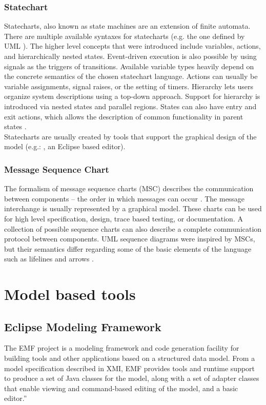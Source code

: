 \subsubsection{Statechart}

Statecharts, also known as state machines are an extension of finite automata. There are multiple available syntaxes for statecharts (e.g. the one defined by UML \citep{stcuml}). The higher level concepts that were introduced include variables, actions, and hierarchically nested states. Event-driven execution is also possible by using signals as the triggers of transitions. Available variable types heavily depend on the concrete semantics of the chosen statechart language. Actions can usually be variable assignments, signal raises, or the setting of timers. Hierarchy lets users organize system descriptions using a top-down approach. Support for hierarchy is introduced via nested states and parallel regions. States can also have entry and exit actions, which allows the description of common functionality in parent states \citep{stcmove}.\\
Statecharts are usually created by tools that support the graphical design of the model (e.g.: \citep{yakinduu}, an Eclipse based editor).

\subsubsection{Message Sequence Chart}

The formalism of message sequence charts (MSC) describes the communication between components -- the order in which messages can occur \citep{msc} \citep{msc2}. The message interchange is usually represented by a graphical model. These charts can be used for high level specification, design, trace based testing, or documentation. A collection of possible sequence charts can also describe a complete communication protocol between components. UML sequence diagrams were inspired by MSCs, but their semantics differ regarding some of the basic elements of the language such as lifelines and arrows \citep{mscuml}.

\section{Model based tools}

\subsection{Eclipse Modeling Framework}
The EMF project is a modeling framework and code generation facility for building tools and other applications based on a structured data model. From a model specification described in XMI, EMF provides tools and runtime support to produce a set of Java classes for the model, along with a set of adapter classes that enable viewing and command-based editing of the model, and a basic editor.'' \cite{EMF}

